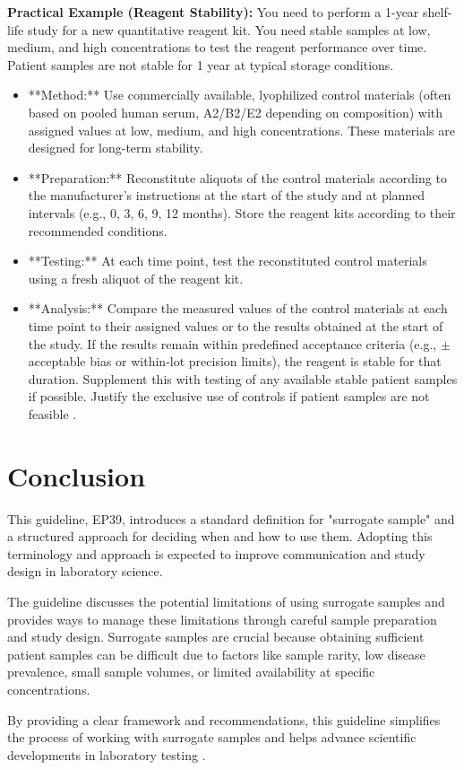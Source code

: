\documentclass{article}
\begin{document}
\textbf{Practical Example (Reagent Stability):}
You need to perform a 1-year shelf-life study for a new quantitative reagent kit. You need stable samples at low, medium, and high concentrations to test the reagent performance over time. Patient samples are not stable for 1 year at typical storage conditions.
\begin{itemize}
    \item **Method:** Use commercially available, lyophilized control materials (often based on pooled human serum, A2/B2/E2 depending on composition) with assigned values at low, medium, and high concentrations. These materials are designed for long-term stability.
    \item **Preparation:** Reconstitute aliquots of the control materials according to the manufacturer's instructions at the start of the study and at planned intervals (e.g., 0, 3, 6, 9, 12 months). Store the reagent kits according to their recommended conditions.
    \item **Testing:** At each time point, test the reconstituted control materials using a fresh aliquot of the reagent kit.
    \item **Analysis:** Compare the measured values of the control materials at each time point to their assigned values or to the results obtained at the start of the study. If the results remain within predefined acceptance criteria (e.g., $\pm$ acceptable bias or within-lot precision limits), the reagent is stable for that duration. Supplement this with testing of any available stable patient samples if possible. Justify the exclusive use of controls if patient samples are not feasible \cite{CLSIEP25}.
\end{itemize}

\section{Conclusion}

This guideline, EP39, introduces a standard definition for "surrogate sample" and a structured approach for deciding when and how to use them. Adopting this terminology and approach is expected to improve communication and study design in laboratory science.

The guideline discusses the potential limitations of using surrogate samples and provides ways to manage these limitations through careful sample preparation and study design. Surrogate samples are crucial because obtaining sufficient patient samples can be difficult due to factors like sample rarity, low disease prevalence, small sample volumes, or limited availability at specific concentrations.

By providing a clear framework and recommendations, this guideline simplifies the process of working with surrogate samples and helps advance scientific developments in laboratory testing \cite{CLSIEP39Ed1E}.


\end{document}
